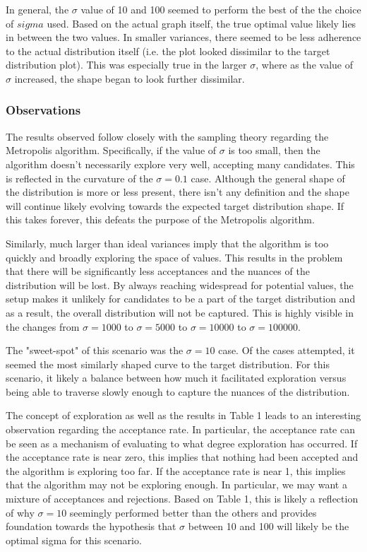 \documentclass{article} %
\begin{document}
In general, the \(\sigma\) value of 10 and 100 seemed to perform the best of the the choice of \(sigma\) used. Based on the actual graph itself, the true optimal value likely lies in between the two values. In smaller variances, there seemed to be less adherence to the actual distribution itself (i.e. the plot looked dissimilar to the target distribution plot). This was especially true in the larger \(\sigma\), where as the value of \(\sigma\) increased, the shape began to look further dissimilar.

\subsubsection{Observations}

The results observed follow closely with the sampling theory regarding the Metropolis algorithm. Specifically, if the value of \(\sigma\) is too small, then the algorithm doesn't necessarily explore very well, accepting many candidates. This is reflected in the curvature of the \(\sigma=0.1\) case. Although the general shape of the distribution is more or less present, there isn't any definition and the shape will continue likely evolving towards the expected target distribution shape. If this takes forever, this defeats the purpose of the Metropolis algorithm.

Similarly, much larger than ideal variances imply that the algorithm is too quickly and broadly exploring the space of values. This results in the problem that there will be significantly less acceptances and the nuances of the distribution will be lost. By always reaching widespread for potential values, the setup makes it unlikely for candidates to be a part of the target distribution and as a result, the overall distribution will not be captured. This is highly visible in the changes from \(\sigma=1000\) to \(\sigma=5000\) to \(\sigma=10000\) to \(\sigma=100000\).

The "sweet-spot" of this scenario was the \(\sigma=10\) case. Of the cases attempted, it seemed the most similarly shaped curve to the target distribution. For this scenario, it likely a balance between how much it facilitated exploration versus being able to traverse slowly enough to capture the nuances of the distribution. 

The concept of exploration as well as the results in Table 1 leads to an interesting observation regarding the acceptance rate. In particular, the acceptance rate can be seen as a mechanism of evaluating to what degree exploration has occurred. If the acceptance rate is near zero, this implies that nothing had been accepted and the algorithm is exploring too far. If the acceptance rate is near 1, this implies that the algorithm may not be exploring enough. In particular, we may want a mixture of acceptances and rejections. Based on Table 1, this is likely a reflection of why \(\sigma=10\) seemingly performed better than the others and provides foundation towards the hypothesis that \(\sigma\) between 10 and 100 will likely be the optimal sigma for this scenario. 
\end{document}

